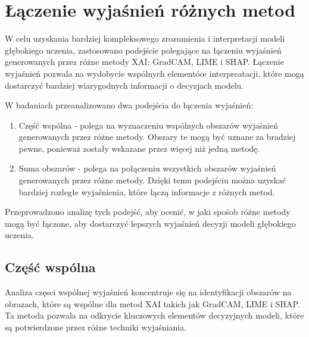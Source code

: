 \section*{Łączenie wyjaśnień różnych metod}

W celu uzyskania bardziej kompleksowego zrozumienia i interpretacji modeli głębokiego uczenia, zastosowano podejście polegające na łączeniu wyjaśnień generowanych przez różne metody XAI: GradCAM, LIME i SHAP.
Łączenie wyjaśnień pozwala na wydobycie wspólnych elementóœ interpreatacji, które mogą dostarczyć bardziej wiarygodnych informacji o decyzjach modelu.

W badaniach przeanalizowano dwa podejścia do łączenia wyjaśnień:
\begin{enumerate}
	\item Część wspólna - polega na wyznaczeniu wspólnych obszarów wyjaśnień generowanych przez różne metody.
	      Obszary te mogą być uznane za  bradziej pewne, ponieważ zostały wskazane przez więcej niż jedną metodę.
	\item Suma obszarów - polega na połączeniu wszystkich obszarów wyjaśnień generowanych przez różne metody.
	      Dzięki temu podejściu można uzyskać bardziej rozległe wyjaśnienia, które łączą informacje z różnych metod.
\end{enumerate}

Przeprowadzono analizę tych podejść, aby ocenić, w jaki spośob różne metody mogą być łączone, aby dostarczyć lepszych wyjaśnień decyzji modeli głębokiego uczenia.

\subsection*{Część wspólna}
Analiza częsci wspólnej wyjaśnień koncentruje się na identyfikacji obszarów na obrazach, które są wspólne dla metod XAI takich jak GradCAM, LIME i SHAP.
Ta metoda pozwala na odkrycie kluczowych elementów decyzyjnych modeli, które są potwierdzone przez różne techniki wyjaśniania.

